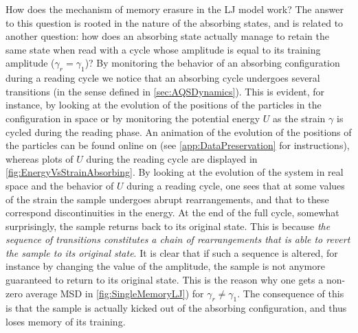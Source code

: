 How does the mechanism of memory erasure in the LJ model work? The answer to this question is rooted in the nature of the absorbing states, and is related to another question: how does an absorbing state actually manage to retain the same state when read with a cycle whose amplitude is equal to its training amplitude ($\gamma_{r} = \gamma_{1}$)? By monitoring the behavior of an absorbing configuration during a reading cycle we notice that an absorbing cycle undergoes several transitions (in the sense defined in \autoref{sec:AQSDynamics}). This is evident, for instance, by looking at the evolution of the positions of the particles in the configuration in space or by monitoring the potential energy $U$ as the strain $\gamma$ is cycled during the reading phase. An animation of the evolution of the positions of the particles can be found online on \cite{mygithub} (see \autoref{app:DataPreservation} for instructions), whereas plots of $U$ during the reading cycle are displayed in \autoref{fig:EnergyVsStrainAbsorbing}.
By looking at the evolution of the system in real space and the behavior of $U$ during a reading cycle, one sees that at some values of the strain the sample undergoes abrupt rearrangements, and that to these correspond discontinuities in the energy. At the end of the full cycle, somewhat surprisingly, the sample returns back to its original state. This is because \emph{the sequence of transitions constitutes a chain of rearrangements that is able to revert the sample to its original state}. It is clear that if such a sequence is altered, for instance by changing the value of the amplitude, the sample is not anymore guaranteed to return to its original state. This is the reason why one gets a non-zero average MSD in \autoref{fig:SingleMemoryLJ}) for $\gamma_{r} \neq \gamma_{1}$. The consequence of this is that the sample is actually kicked out of the absorbing configuration, and thus loses memory of its training.

